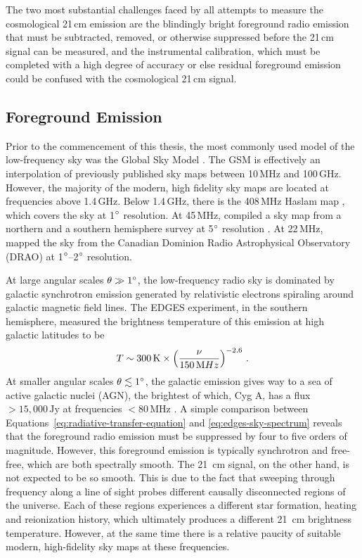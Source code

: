 \begin{bibunit}
The two most substantial challenges faced by all attempts to measure the cosmological 21\,cm
emission are the blindingly bright foreground radio emission that must be subtracted, removed, or
otherwise suppressed before the 21\,cm signal can be measured, and the instrumental calibration,
which must be completed with a high degree of accuracy or else residual foreground emission could be
confused with the cosmological 21\,cm signal.

\subsection{Foreground Emission}

Prior to the commencement of this thesis, the most commonly used model of the low-frequency sky was
the Global Sky Model \citep[GSM;][]{2008MNRAS.388..247D}. The GSM is effectively an interpolation of
previously published sky maps between 10\,MHz and 100\,GHz. However, the majority of the modern,
high fidelity sky maps are located at frequencies above 1.4\,GHz. Below 1.4\,GHz, there is the
408\,MHz Haslam map \citep{1981A&A...100..209H,1982A&AS...47....1H}, which covers the sky at
1$\arcdeg$ resolution. At 45\,MHz, \citet{2011A&A...525A.138G} compiled a sky map from a northern
and a southern hemisphere survey at 5$\arcdeg$ resolution
\citep{1997A&AS..124..315A,1999A&AS..140..145M}. At 22\,MHz, \citet{1999A&AS..137....7R} mapped the
sky from the Canadian Dominion Radio Astrophysical Observatory (DRAO) at 1$\arcdeg$--2$\arcdeg$
resolution.



At large angular scales $\theta \gg 1\arcdeg$, the low-frequency radio sky is dominated by galactic
synchrotron emission generated by relativistic electrons spiraling around galactic magnetic field
lines. The EDGES experiment, in the southern hemisphere, measured the brightness temperature of this
emission at high galactic latitudes to be \citep{2017MNRAS.464.4995M}
\begin{equation}\label{eq:edges-sky-spectrum}
    T \sim 300\,{\rm K} \times \left(\frac{\nu}{150\,{\rm MHz}}\right)^{-2.6}\,.
\end{equation}
At smaller angular scales $\theta \lesssim 1\arcdeg$, the galactic emission gives way to a sea of
active galactic nuclei (AGN), the brightest of which, Cyg A, has a flux $>15,000\,\text{Jy}$ at
frequencies $<80\,\text{MHz}$ \citep{1977A&A....61...99B}. A simple comparison between
Equations~\ref{eq:radiative-transfer-equation} and \ref{eq:edges-sky-spectrum} reveals that the
foreground radio emission must be suppressed by four to five orders of magnitude.  However, this
foreground emission is typically synchrotron and free-free, which are both spectrally smooth. The
21~cm signal, on the other hand, is not expected to be so smooth. This is due to the fact that
sweeping through frequency along a line of sight probes different causally disconnected regions of
the universe. Each of these regions experiences a different star formation, heating and reionization
history, which ultimately produces a different 21~cm brightness temperature.  However, at the same
time there is a relative paucity of suitable modern, high-fidelity sky maps at these frequencies.


\end{bibunit}
